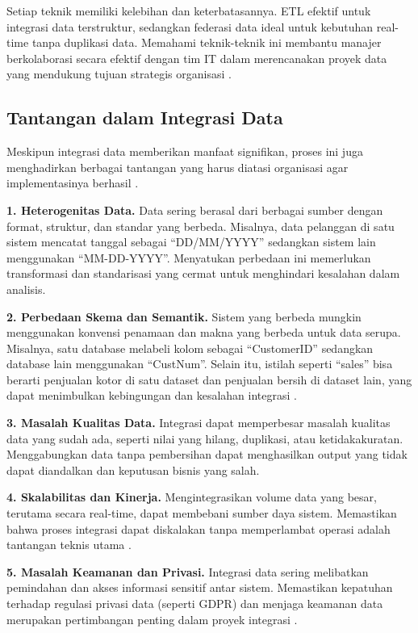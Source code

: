 Setiap teknik memiliki kelebihan dan keterbatasannya. ETL efektif untuk integrasi data terstruktur, sedangkan federasi data ideal untuk kebutuhan real-time tanpa duplikasi data. Memahami teknik-teknik ini membantu manajer berkolaborasi secara efektif dengan tim IT dalam merencanakan proyek data yang mendukung tujuan strategis organisasi \cite{hasselbring2000information}.


\subsection{Tantangan dalam Integrasi Data}

Meskipun integrasi data memberikan manfaat signifikan, proses ini juga menghadirkan berbagai tantangan yang harus diatasi organisasi agar implementasinya berhasil \cite{alexe2006cleaning}.

\textbf{1. Heterogenitas Data.}  
Data sering berasal dari berbagai sumber dengan format, struktur, dan standar yang berbeda. Misalnya, data pelanggan di satu sistem mencatat tanggal sebagai “DD/MM/YYYY” sedangkan sistem lain menggunakan “MM-DD-YYYY”. Menyatukan perbedaan ini memerlukan transformasi dan standarisasi yang cermat untuk menghindari kesalahan dalam analisis.

\textbf{2. Perbedaan Skema dan Semantik.}  
Sistem yang berbeda mungkin menggunakan konvensi penamaan dan makna yang berbeda untuk data serupa. Misalnya, satu database melabeli kolom sebagai “CustomerID” sedangkan database lain menggunakan “CustNum”. Selain itu, istilah seperti “sales” bisa berarti penjualan kotor di satu dataset dan penjualan bersih di dataset lain, yang dapat menimbulkan kebingungan dan kesalahan integrasi \cite{doan2003reconciling}.

\textbf{3. Masalah Kualitas Data.}  
Integrasi dapat memperbesar masalah kualitas data yang sudah ada, seperti nilai yang hilang, duplikasi, atau ketidakakuratan. Menggabungkan data tanpa pembersihan dapat menghasilkan output yang tidak dapat diandalkan dan keputusan bisnis yang salah.

\textbf{4. Skalabilitas dan Kinerja.}  
Mengintegrasikan volume data yang besar, terutama secara real-time, dapat membebani sumber daya sistem. Memastikan bahwa proses integrasi dapat diskalakan tanpa memperlambat operasi adalah tantangan teknis utama \cite{nash2019big}.

\textbf{5. Masalah Keamanan dan Privasi.}  
Integrasi data sering melibatkan pemindahan dan akses informasi sensitif antar sistem. Memastikan kepatuhan terhadap regulasi privasi data (seperti GDPR) dan menjaga keamanan data merupakan pertimbangan penting dalam proyek integrasi \cite{zhang2019security}.


